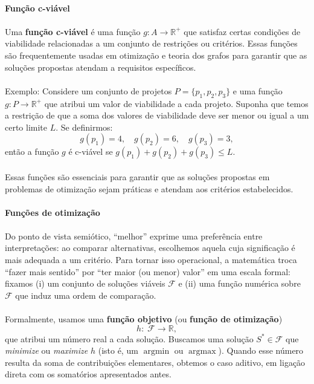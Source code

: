 \documentclass[12pt,a4paper]{article}
\begin{document}
\paragraph{Função c-viável}

\paragraph{}Uma \textbf{função c-viável} é uma função \(g: A \to \mathbb{R}^+\) que satisfaz certas condições de viabilidade relacionadas a um conjunto de restrições ou critérios. Essas funções são frequentemente usadas em otimização e teoria dos grafos para garantir que as soluções propostas atendam a requisitos específicos.
\paragraph{}
Exemplo: Considere um conjunto de projetos \(P = \{p_1, p_2, p_3\}\) e uma função \(g: P \to \mathbb{R}^+\) que atribui um valor de viabilidade a cada projeto. Suponha que temos a restrição de que a soma dos valores de viabilidade deve ser menor ou igual a um certo limite \(L\). Se definirmos:
\[g(p_1) = 4, \quad g(p_2) = 6, \quad g(p_3) = 3,\]
então a função \(g\) é c-viável se \(g(p_1) + g(p_2) + g(p_3) \leq L\).
\paragraph{}Essas funções são essenciais para garantir que as soluções propostas em problemas de otimização sejam práticas e atendam aos critérios estabelecidos.

\paragraph{Funções de otimização}

\paragraph{}
Do ponto de vista semiótico, “melhor” exprime uma preferência entre interpretações: ao comparar alternativas, escolhemos aquela cuja significação é mais adequada a um critério. Para tornar isso operacional, a matemática troca “fazer mais sentido” por “ter maior (ou menor) valor” em uma escala formal: fixamos (i) um conjunto de soluções viáveis \(\mathcal{F}\) e (ii) uma função numérica sobre \(\mathcal{F}\) que induz uma ordem de comparação.

\paragraph{}
Formalmente, usamos uma \textbf{função objetivo} (ou \textbf{função de otimização})
\[h:\; \mathcal{F} \to \mathbb{R},\]
que atribui um número real a cada solução. Buscamos uma solução \(S^*\in\mathcal{F}\) que \emph{minimize} ou \emph{maximize} \(h\) (isto é, um \(\operatorname*{argmin}\) ou \(\operatorname*{argmax}\)). Quando esse número resulta da soma de contribuições elementares, obtemos o caso aditivo, em ligação direta com os somatórios apresentados antes.
\end{document}
